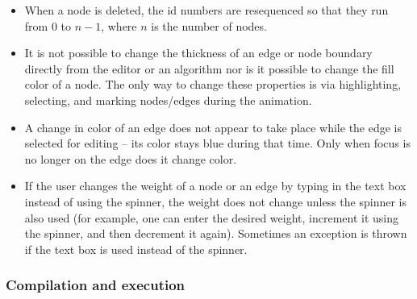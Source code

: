 \begin{itemize}

\item
When a node is deleted, the id numbers are resequenced so that they run from
0 to $n-1$, where $n$ is the number of nodes.

\item
It is not possible to change the thickness of an edge or node boundary directly
from the editor or an algorithm nor is it possible to change the fill color of a node.
The only way to change these properties is via highlighting, selecting, and
marking nodes/edges during the animation.

\item
A change in color of an edge does not appear to take place while the edge
is selected for editing -- its color stays blue during that time.
Only when focus is no longer on the edge does it change color.

\item
If the user changes the weight of a node or an edge by typing in the text box instead of using the spinner, the weight does not change unless the spinner is
also used (for example, one can enter the desired weight, increment it using the spinner, and then decrement it again).
Sometimes an exception is thrown if the text box is used instead of the spinner. 

\end{itemize}

\subsubsection*{Compilation and execution}

